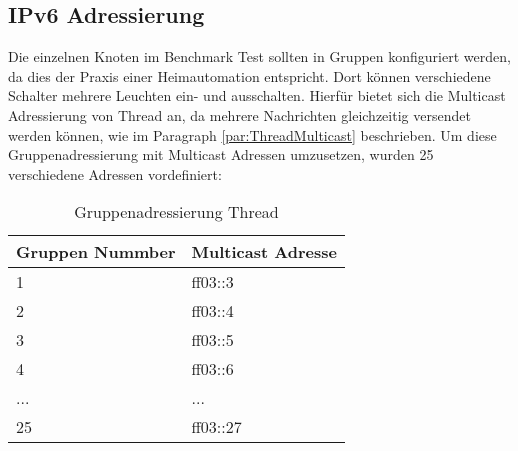 \subsection{IPv6 Adressierung}\label{subsec:IPv6Adressierung}
Die einzelnen Knoten im Benchmark Test sollten in Gruppen konfiguriert werden, da dies der Praxis einer Heimautomation entspricht. Dort können verschiedene Schalter mehrere Leuchten ein- und ausschalten. Hierfür bietet sich die Multicast Adressierung von Thread an, da mehrere Nachrichten gleichzeitig versendet werden können, wie im Paragraph \ref{par:ThreadMulticast} beschrieben. Um diese Gruppenadressierung mit Multicast Adressen umzusetzen, wurden 25 verschiedene Adressen vordefiniert:

\begin{table}[H]
	\centering
	\begin{tabular}{|l|l|}
		\hline
		\textbf{Gruppen Nummber} & \textbf{Multicast Adresse} \\ \hline
		1                        & ff03::3                    \\ \hline
		2                        & ff03::4                    \\ \hline
		3                        & ff03::5                    \\ \hline
		4                        & ff03::6                    \\ \hline
		...                      & ...                        \\ \hline
		25                       & ff03::27                   \\ \hline
	\end{tabular}
	\caption{Gruppenadressierung Thread}
	\label{table:GruppenadressierungThread}
\end{table}